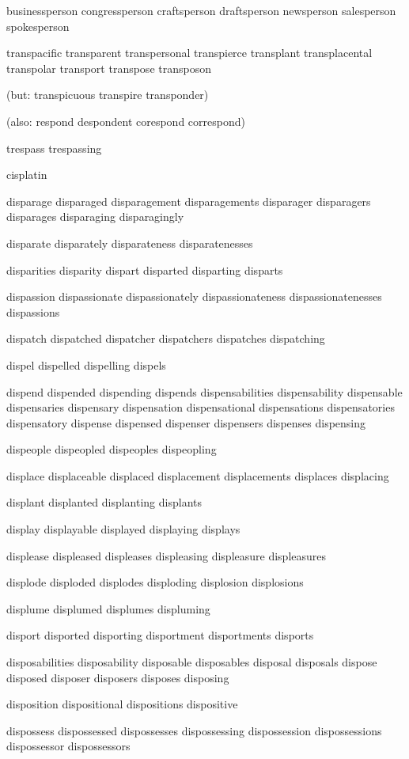 \begin{itemize}
businessperson congressperson craftsperson draftsperson newsperson salesperson spokesperson

transpacific transparent transpersonal transpierce  transplant transplacental transpolar transport transpose transposon

(but: transpicuous transpire transponder)

(also: respond despondent corespond correspond)

trespass trespassing

cisplatin

disparage disparaged disparagement disparagements disparager disparagers disparages disparaging disparagingly

disparate disparately disparateness disparatenesses

disparities disparity dispart disparted disparting disparts

dispassion dispassionate dispassionately dispassionateness dispassionatenesses dispassions

dispatch dispatched dispatcher dispatchers dispatches dispatching

dispel dispelled dispelling dispels

dispend dispended dispending dispends dispensabilities dispensability dispensable dispensaries dispensary dispensation dispensational dispensations dispensatories dispensatory dispense dispensed dispenser dispensers dispenses dispensing

dispeople dispeopled dispeoples dispeopling

displace displaceable displaced displacement displacements displaces displacing

displant displanted displanting displants

display displayable displayed displaying displays

displease displeased displeases displeasing displeasure displeasures

displode disploded displodes disploding displosion displosions

displume displumed displumes displuming

disport disported disporting disportment disportments disports

disposabilities disposability disposable disposables disposal disposals dispose disposed disposer disposers disposes disposing

disposition dispositional dispositions dispositive

dispossess dispossessed dispossesses dispossessing dispossession dispossessions dispossessor dispossessors


\end{itemize}

